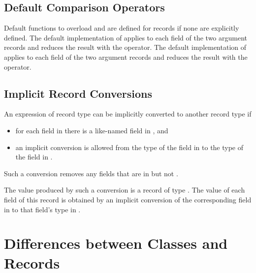 \subsection{Default Comparison Operators}
\label{Record_Comparison_Operators}
Default functions to overload \chpl{==} and \chpl{\!=} are defined for
records if none are explicitly defined.
The default implementation of \chpl{==} applies \chpl{==} to each
field of the two argument records and reduces the result with
the \chpl{&&} operator.  The default implementation of \chpl{\!=}
applies \chpl{\!=} to each field of the two argument records and
reduces the result with the \chpl{||} operator.

\subsection{Implicit Record Conversions}
\label{Implicit_Record_Conversions}

An expression of record type  can be implicitly converted to
another record type  if

\begin{itemize}
\item for each field in  there is a like-named field in ,
      and
\item an implicit conversion is allowed from the type of the field in 
      to the type of the field in .
\end{itemize}
Such a conversion removes any fields that are in  but not .

The value produced by such a conversion is a record of type .
The value of each field of this record is obtained by an implicit
conversion of the corresponding field in  to
that field's type in .


\section{Differences between Classes and Records}
\label{Class_and_Record_Differences}

